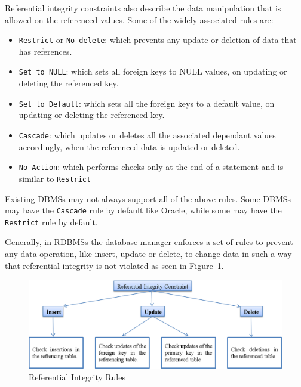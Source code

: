  
Referential integrity constraints also describe the data manipulation that is
allowed on the referenced values.  Some of the widely associated rules are:

	\begin{itemize}	
		\item \texttt{Restrict} or \texttt{No delete}: which prevents any update or
		deletion of data that has references. 		
		\item \texttt{Set to NULL}: which sets all foreign keys to NULL values,   on
		updating or deleting the referenced key. 		
		\item \texttt{Set to Default}: which sets all the foreign
		keys to a default value,   on updating or deleting the referenced key. 		
		\item \texttt{Cascade}: which updates or deletes all the
		associated dependant values accordingly,   when the referenced data is updated or
		deleted. 		
		\item \texttt{No Action}: which performs checks only at the end of a
		statement and is similar to \texttt{Restrict}		
	\end{itemize}

Existing \acp{DBMS} may not always support all of the above rules.  Some \acp{DBMS} may
have the \texttt{Cascade} rule by default like Oracle,   while some may have the
\texttt{Restrict} rule by default.  

Generally,   in \acp{RDBMS} the database manager enforces a set of rules to
prevent any data operation,   like insert,   update or delete,   to change data
in such a way that referential integrity is not violated as seen in
Figure~\ref{f:RI}. 

	\begin{figure}[H]
		\centering
		\includegraphics[width=.8\textwidth]{./figure/Example/RI-Figure.png}
		\caption{Referential Integrity Rules}\label{f:RI}
	\end{figure}




